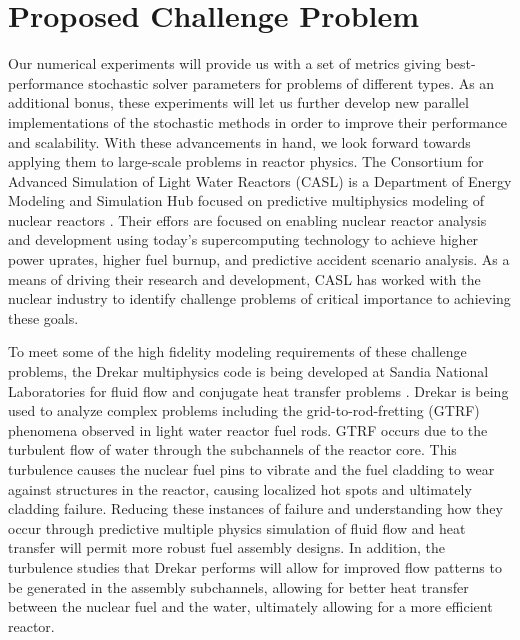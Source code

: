\section{Proposed Challenge Problem}
\label{sec:challenge_problem}
Our numerical experiments will provide us with a set of metrics giving
best-performance stochastic solver parameters for problems of
different types. As an additional bonus, these experiments will let us
further develop new parallel implementations of the stochastic methods
in order to improve their performance and scalability. With these
advancements in hand, we look forward towards applying them to
large-scale problems in reactor physics. The Consortium for Advanced
Simulation of Light Water Reactors (CASL) is a Department of Energy
Modeling and Simulation Hub focused on predictive multiphysics
modeling of nuclear reactors
\citep{u.s._department_of_energy_casl_2011}. Their effors are focused
on enabling nuclear reactor analysis and development using today's
supercomputing technology to achieve higher power uprates, higher fuel
burnup, and predictive accident scenario analysis. As a means of
driving their research and development, CASL has worked with the
nuclear industry to identify challenge problems of critical importance
to achieving these goals.

To meet some of the high fidelity modeling requirements of these
challenge problems, the Drekar multiphysics code is being developed at
Sandia National Laboratories for fluid flow and conjugate heat
transfer problems \citep{pawlowski_drekar_2012}. Drekar is being
used to analyze complex problems including the grid-to-rod-fretting
(GTRF) phenomena observed in light water reactor fuel rods. GTRF
occurs due to the turbulent flow of water through the subchannels of
the reactor core. This turbulence causes the nuclear fuel pins to
vibrate and the fuel cladding to wear against structures in the
reactor, causing localized hot spots and ultimately cladding
failure. Reducing these instances of failure and understanding how
they occur through predictive multiple physics simulation of fluid
flow and heat transfer will permit more robust fuel assembly
designs. In addition, the turbulence studies that Drekar performs will
allow for improved flow patterns to be generated in the assembly
subchannels, allowing for better heat transfer between the nuclear
fuel and the water, ultimately allowing for a more efficient reactor.

